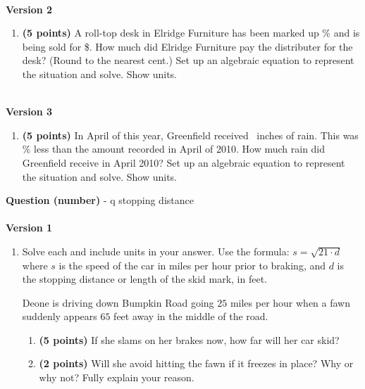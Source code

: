 \documentclass[12pt]{amsart}
\begin{document}
\begin{enumerate}[resume]
\vfill 
 \end{enumerate}$ $ \\ {\bf Version 2} \\\begin{enumerate}[resume]
\item {\bf (5 points)} 
 A roll-top desk in Elridge Furniture has been marked up \discount\% and is being sold for \$\paid. How much did Elridge Furniture pay the distributer for the desk? (Round to the nearest cent.) Set up an algebraic equation to represent the situation and solve. Show units.

\vfill 
 \end{enumerate}$ $ \\ {\bf Version 3} \\\begin{enumerate}[resume]
\item {\bf (5 points)} 
 In April of this year, Greenfield received \rainy\ inches of rain. This was \discount\% less than the amount recorded in April of 2010. How much rain did Greenfield  receive in April 2010? Set up an algebraic equation to represent the situation and solve. Show units.

\vfill 
 \end{enumerate}\newpage\def \insvar{21}\def \d{65}\def \zerospeed{36.95}\def \slimit{25}\def \s{44}\def \skidd{92.19}\def \safed{29.762}\def \rsafed{29}{\Large{\bf Question (number)}} - q stopping distance\\ $ $ \\ {\bf Version 1} \\\begin{enumerate}[resume]

 
\item Solve each and include units in your answer. Use the formula: $s = \sqrt{\insvar \cdot d}$ where $s$ is the speed of the car in miles per hour prior to braking, and $d$ is the stopping distance or length of the skid mark, in feet. 

\vspace{3mm}

Deone is driving down Bumpkin Road going $\slimit$ miles per hour when a fawn suddenly appears $\d$ feet away in the middle of the road. \begin{enumerate}
\item {\bf (5 points)} If she slams on her brakes now, how far will her car skid? \vspace{4cm}
\item {\bf (2 points)} Will she avoid hitting the fawn if it freezes in place? Why or why not? Fully explain your reason. \vspace{3cm}
\end{enumerate}



\end{enumerate}
\end{document}

